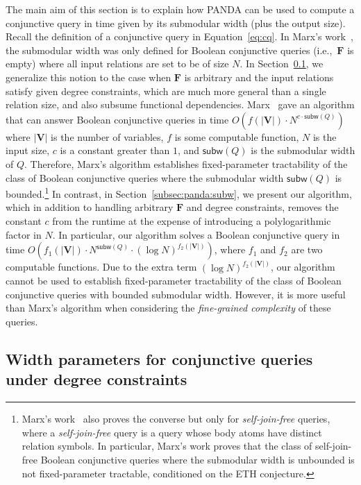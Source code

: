 \documentclass{theoretics}
\newcommand{\panda}{\textsf{PANDA}\xspace}
\newcommand{\subm}{\textsf{subw}}
\begin{document}
The main aim of this section is to explain how \panda can be used to compute a conjunctive
query in time given by its submodular width (plus the output size). Recall the definition of
a conjunctive query in Equation~\eqref{eq:cq}.
In Marx's work~\cite{DBLP:journals/jacm/Marx13}, the submodular width was only defined for Boolean
conjunctive queries (i.e.,~$\bm F$ is empty) where all input relations are set to be of size
$N$. In Section~\ref{subsec:width:parameters}, we generalize this notion to the case when $\bm F$ is arbitrary and the
input relations satisfy given degree constraints, which are much more general than a single relation
size, and also subsume functional dependencies.
Marx~\cite{DBLP:journals/jacm/Marx13} gave an algorithm that can answer Boolean conjunctive queries in time
$O(f(|\bm V|)\cdot N^{c\cdot\subm(Q)})$ where $|\bm V|$ is the number of variables, $f$ is some computable function, $N$ is the input size, $c$ is a constant greater than $1$, and $\subm(Q)$
is the submodular width of $Q$.
Therefore, Marx's algorithm establishes fixed-parameter tractability of the class of Boolean conjunctive queries
where the submodular width $\subm(Q)$ is bounded.\footnote{Marx's work~\cite{DBLP:journals/jacm/Marx13} also proves the converse but only for {\em self-join-free} queries,
where a {\em self-join-free} query is a query whose body atoms have distinct relation symbols.
In particular, Marx's work proves that the class of self-join-free Boolean conjunctive queries
where the submodular width is unbounded is not fixed-parameter tractable, conditioned on the ETH conjecture.}
In contrast, in Section~\ref{subsec:panda:subw}, we present our algorithm, which in addition to handling arbitrary $\bm F$ and degree constraints, removes the constant $c$ from the runtime
at the expense of introducing a polylogarithmic factor in $N$.
In particular, our algorithm solves a Boolean conjunctive query in time
$O(f_1(|\bm V|)\cdot N^{\subm(Q)}\cdot (\log N)^{f_2(|\bm V|)})$,
where $f_1$ and $f_2$ are two computable functions.
Due to the extra term $(\log N)^{f_2(|\bm V|)}$, our algorithm cannot be used to establish
fixed-parameter tractability of the class of Boolean conjunctive queries with bounded submodular width.
However, it is more useful than Marx's algorithm when considering the {\em fine-grained complexity} of these queries.

\subsection{Width parameters for conjunctive queries under degree constraints}
\label{subsec:width:parameters}
\end{document}
